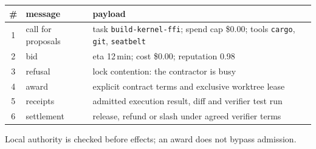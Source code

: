 \begin{minipage}{11.1cm}
\par\vspace{4pt}
\pdfiglabel
\begin{tabularx}{\linewidth}{@{}c >{\raggedright\arraybackslash}p{2.1cm} >{\raggedright\arraybackslash}X@{}}
\toprule
\# & message & payload \\
\midrule
1 & call for proposals & task \texttt{build-kernel-ffi}; spend cap \$0.00; tools \texttt{cargo}, \texttt{git}, \texttt{seatbelt} \\
2 & bid & eta 12\,min; cost \$0.00; reputation 0.98 \\
3 & refusal & lock contention: the contractor is busy \\
4 & award & explicit contract terms and exclusive worktree lease \\
5 & receipts & admitted execution result, diff and verifier test run \\
6 & settlement & release, refund or slash under agreed verifier terms \\
\bottomrule
\end{tabularx}
\par\smallskip
{\pdfiglabelitalic\raggedright Local authority is checked before effects; an award does not bypass admission.\par}
\end{minipage}
